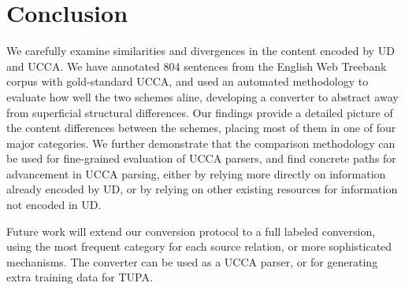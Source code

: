 \documentclass[11pt,a4paper]{article}
\begin{document}
\section{Conclusion}\label{sec:conclusion}

We carefully examine similarities and divergences in the content encoded by UD and UCCA. We have annotated 804
sentences from the English Web Treebank corpus with gold-standard UCCA,
and used an automated methodology to
evaluate how well the two schemes aline, developing
a converter to abstract away from superficial structural
differences. Our findings provide a detailed picture of the content differences between the schemes, placing most of them
in one of four major categories. We further demonstrate that the comparison methodology can be used for fine-grained
evaluation of UCCA parsers, and find concrete paths for advancement in UCCA parsing, either by relying more directly on 
information already encoded by UD, or by relying on other existing resources for information not encoded in UD.

Future work will extend our conversion protocol to a full labeled conversion,
using the most frequent category for each source relation,
or more sophisticated mechanisms.
The converter can be used as a UCCA parser,
or for generating extra training data for TUPA.






\end{document}
